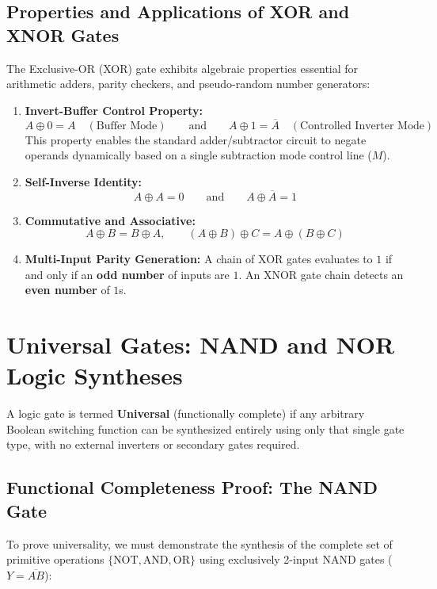 \subsection{Properties and Applications of XOR and XNOR Gates}
The Exclusive-OR (XOR) gate exhibits algebraic properties essential for arithmetic adders, parity checkers, and pseudo-random number generators:

\begin{enumerate}[label=\bfseries\alph*.]
    \item \textbf{Invert-Buffer Control Property:}
    \[ A \oplus 0 = A \quad (\text{Buffer Mode}) \qquad \text{and} \qquad A \oplus 1 = \overline{A} \quad (\text{Controlled Inverter Mode}) \]
    This property enables the standard adder/subtractor circuit to negate operands dynamically based on a single subtraction mode control line ($M$).
    \item \textbf{Self-Inverse Identity:}
    \[ A \oplus A = 0 \qquad \text{and} \qquad A \oplus \overline{A} = 1 \]
    \item \textbf{Commutative and Associative:}
    \[ A \oplus B = B \oplus A, \qquad (A \oplus B) \oplus C = A \oplus (B \oplus C) \]
    \item \textbf{Multi-Input Parity Generation:} A chain of XOR gates evaluates to $1$ if and only if an \textbf{odd number} of inputs are $1$. An XNOR gate chain detects an \textbf{even number} of $1$s.
\end{enumerate}


\section{Universal Gates: NAND and NOR Logic Syntheses}
\label{sec:universal_gates}

A logic gate is termed \textbf{Universal} (functionally complete) if any arbitrary Boolean switching function can be synthesized entirely using only that single gate type, with no external inverters or secondary gates required.

\subsection{Functional Completeness Proof: The NAND Gate}
To prove universality, we must demonstrate the synthesis of the complete set of primitive operations $\{\text{NOT}, \text{AND}, \text{OR}\}$ using exclusively 2-input NAND gates ($Y = \overline{AB}$):

